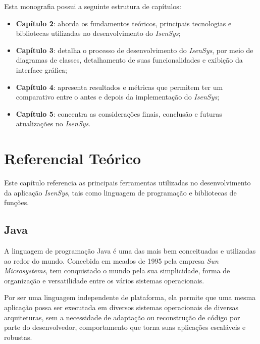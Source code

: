 \documentclass[
	12pt,			%
	openright,		%
	oneside,	
	a4paper,		%
	english,		%
	brazil			%
]{abntex2/abntex2}  %
\begin{document}
			Esta monografia possui a seguinte estrutura de capítulos:
			
			\begin{itemize}
				
				\item \textbf{Capítulo 2}: aborda os fundamentos teóricos, principais tecnologias e bibliotecas utilizadas no desenvolvimento do \textit{IsenSys};
				\item \textbf{Capítulo 3}: detalha o processo de desenvolvimento do \textit{IsenSys}, por meio de diagramas de classes, detalhamento de suas funcionalidades e exibição da interface gráfica;
				\item \textbf{Capítulo 4}: apresenta resultados e métricas que permitem ter um comparativo entre o antes e depois da implementação do \textit{IsenSys};
				\item \textbf{Capítulo 5}: concentra as considerações finais, conclusão e futuras atualizações no \textit{IsenSys}.
				
			\end{itemize}
	
	\chapter{Referencial Teórico}
	
		Este capítulo referencia as principais ferramentas utilizadas no desenvolvimento da aplicação \textit{IsenSys}, tais como linguagem de programação e bibliotecas de funções.
		
		\section{Java}
		
			A linguagem de programação Java \cite{java} é uma das mais bem conceituadas e utilizadas ao redor do mundo. Concebida em meados de 1995 pela empresa \textit{Sun Microsystems}, tem conquistado o mundo pela sua simplicidade, forma de organização e versatilidade entre os vários sistemas operacionais.
		
			Por ser uma linguagem independente de plataforma, ela permite que uma mesma aplicação possa ser executada em diversos sistemas operacionais de diversas arquiteturas, sem a necessidade de adaptação ou reconstrução de código por parte do desenvolvedor, comportamento que torna suas aplicações escaláveis e robustas.
		
\end{document}
